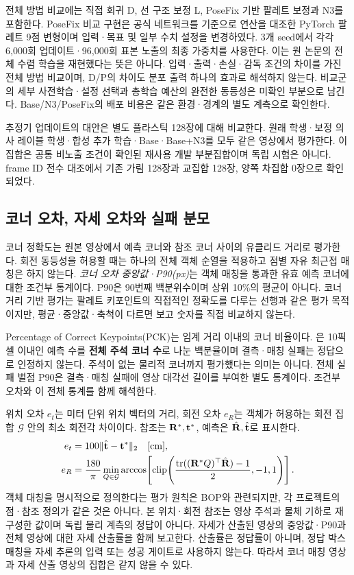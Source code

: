 전체 방법 비교에는 직접 회귀 D, 선 구조 보정 L, PoseFix 기반 팔레트 보정과 N3를 포함한다. PoseFix 비교 구현은 공식 네트워크를 기준으로 연산을 대조한 PyTorch 팔레트 9점 변형이며 입력·목표 및 일부 수치 설정을 변경하였다. 3개 seed에서 각각 6,000회 업데이트·96,000회 표본 노출의 최종 가중치를 사용한다. 이는 원 논문의 전체 수렴 학습을 재현했다는 뜻은 아니다. 입력·출력·손실·감독 조건의 차이를 가진 전체 방법 비교이며, D/P의 차이도 분포 출력 하나의 효과로 해석하지 않는다. 비교군의 세부 사전학습·설정 선택과 총학습 예산의 완전한 동등성은 미확인 부분으로 남긴다. Base/N3/PoseFix의 배포 비용은 같은 환경·경계의 별도 계측으로 확인한다.

추정기 업데이트의 대안은 별도 플라스틱 128장에 대해 비교한다. 원래 학생·보정 의사 레이블 학생·합성 추가 학습·Base·Base+N3를 모두 같은 영상에서 평가한다. 이 집합은 공통 비노출 조건이 확인된 재사용 개발 부분집합이며 독립 시험은 아니다. frame ID 전수 대조에서 기존 가림 128장과 교집합 128장, 양쪽 차집합 0장으로 확인되었다.

\subsection{코너 오차, 자세 오차와 실패 분모}
코너 정확도는 원본 영상에서 예측 코너와 참조 코너 사이의 유클리드 거리로 평가한다. 회전 동등성을 허용할 때는 하나의 전체 객체 순열을 적용하고 점별 자유 최근접 매칭은 하지 않는다. \emph{코너 오차 중앙값·P90(px)}는 객체 매칭을 통과한 유효 예측 코너에 대한 조건부 통계이다. P90은 90번째 백분위수이며 상위 10\%의 평균이 아니다. 코너 거리 기반 평가는 팔레트 키포인트의 직접적인 정확도를 다루는 선행\cite{mueller2024}과 같은 평가 목적이지만, 평균·중앙값·축척이 다르면 보고 숫자를 직접 비교하지 않는다.

Percentage of Correct Keypoints(PCK)는 임계 거리 이내의 코너 비율이다. \pckten 은 10픽셀 이내인 예측 수를 \textbf{전체 주석 코너 수}로 나눈 백분율이며 결측·매칭 실패는 정답으로 인정하지 않는다. 주석이 없는 물리적 코너까지 평가했다는 의미는 아니다. 전체 실패 벌점 P90은 결측·매칭 실패에 영상 대각선 길이를 부여한 별도 통계이다. 조건부 오차와 이 전체 통계를 함께 해석한다.

위치 오차 $e_t$는 미터 단위 위치 벡터의 거리, 회전 오차 $e_R$는 객체가 허용하는 회전 집합 $\mathcal G$ 안의 최소 회전각 차이이다. 참조는 $\mathbf R^*,\mathbf t^*$, 예측은 $\hat{\mathbf R},\hat{\mathbf t}$로 표시한다.
\begin{align}
 e_t&=100\|\hat{\mathbf t}-\mathbf t^*\|_2\quad[\mathrm{cm}],\\
 e_R&=\frac{180}{\pi}\min_{Q\in\mathcal G}\arccos\!\left[\operatorname{clip}\!\left(\frac{\operatorname{tr}((\mathbf R^*Q)^\top\hat{\mathbf R})-1}{2},-1,1\right)\right].
\end{align}
객체 대칭을 명시적으로 정의한다는 평가 원칙은 BOP\cite{bop2018}와 관련되지만, 각 프로젝트의 점·참조 정의가 같은 것은 아니다. 본 위치·회전 참조는 영상 주석과 물체 기하로 재구성한 값이며 독립 물리 계측의 정답이 아니다. 자세가 산출된 영상의 중앙값·P90과 전체 영상에 대한 자세 산출률을 함께 보고한다. 산출률은 정답률이 아니며, 정답 박스 매칭을 자세 추론의 입력 또는 성공 게이트로 사용하지 않는다. 따라서 코너 매칭 영상과 자세 산출 영상의 집합은 같지 않을 수 있다.

